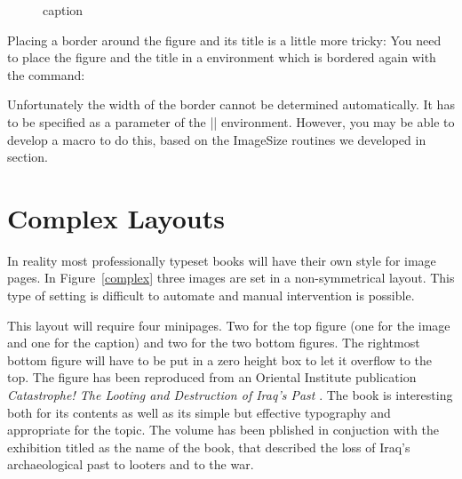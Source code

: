 \begin{dispListing}
\begin{teX}
\begin{figure}[htbp]
  \centering
  \caption{caption}
  \label{Labelname}
\end{figure}
\end{teX}

Placing a border around the figure and its title is a little more tricky: You need to place the figure and the title in a  environment which is bordered again with the  command:

\begin{figure}[htbp]
\centering
 \end{figure}
 
 
%     



Unfortunately the width of the border cannot be determined automatically. It has to be specified as a parameter of the |\minipage| environment. However, you may be able to develop a macro to do this,  based on the ImageSize routines we developed in section.


\section{Complex Layouts}
\label{looting}
In reality most professionally typeset books will have their own style for image pages. In Figure~\ref{complex}
three images are set in a non-symmetrical layout. This type of setting is difficult to automate and manual intervention is possible.

This layout will require four minipages. Two for the top figure (one for the image and one for the caption) and two for the two bottom figures. The rightmost bottom figure will have to be put in a zero height box to let it overflow to the top. The figure has been reproduced from an Oriental Institute publication \emph{Catastrophe! The Looting and Destruction of Iraq’s Past} \cite{looting}. The book is interesting both for its contents as well as its simple but effective typography and appropriate for the topic. The volume has been pblished in conjuction with the exhibition titled as the name of the book, that described the loss of Iraq’s archaeological past to looters and to the war. 


\end{dispListing}
